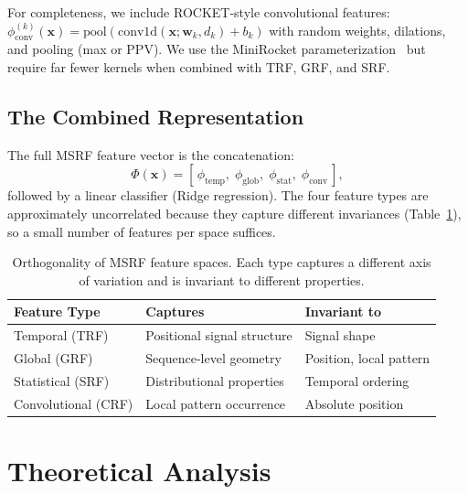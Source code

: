 \documentclass{article}
\begin{document}
For completeness, we include ROCKET-style convolutional features:
$\phi_{\mathrm{conv}}^{(k)}(\mathbf{x}) = \mathrm{pool}(\mathrm{conv1d}(\mathbf{x}; \mathbf{w}_k, d_k) + b_k)$
with random weights, dilations, and pooling (max or PPV).
We use the MiniRocket parameterization~\citep{dempster2021minirocket} but require far fewer kernels when combined with TRF, GRF, and SRF.

\subsection{The Combined Representation}

The full MSRF feature vector is the concatenation:
\begin{equation}
  \Phi(\mathbf{x}) = [\,\phi_{\mathrm{temp}},\;\phi_{\mathrm{glob}},\;\phi_{\mathrm{stat}},\;\phi_{\mathrm{conv}}\,],
\end{equation}
followed by a linear classifier (Ridge regression).
The four feature types are approximately uncorrelated because they capture different invariances (Table~\ref{tab:orthogonality}), so a small number of features per space suffices.

\begin{table}[t]
  \caption{Orthogonality of MSRF feature spaces. Each type captures a different axis of variation and is invariant to different properties.}
  \label{tab:orthogonality}
  \centering
  \small
  \begin{tabular}{@{}lll@{}}
    \toprule
    Feature Type & Captures & Invariant to \\
    \midrule
    Temporal (TRF) & Positional signal structure & Signal shape \\
    Global (GRF) & Sequence-level geometry & Position, local pattern \\
    Statistical (SRF) & Distributional properties & Temporal ordering \\
    Convolutional (CRF) & Local pattern occurrence & Absolute position \\
    \bottomrule
  \end{tabular}
\end{table}


\section{Theoretical Analysis}
\label{sec:theory}
\end{document}
